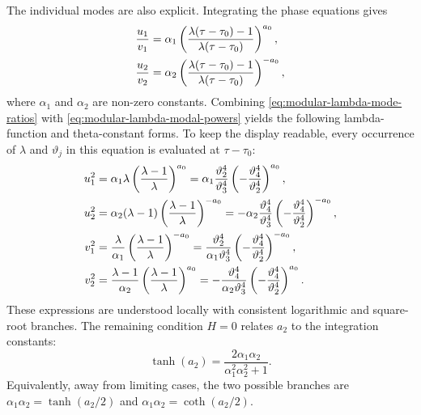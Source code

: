 \documentclass[11pt,a4paper]{article}
\numberwithin{equation}{section}
\begin{document}
The individual modes are also explicit.
Integrating the phase equations gives
\begin{align}
    \frac{u_1}{v_1}
    &=\alpha_1
    \left(
        \frac{\lambda(\tau-\tau_0)-1}{\lambda(\tau-\tau_0)}
    \right)^{a_0},
    \notag\\
    \frac{u_2}{v_2}
    &=\alpha_2
    \left(
        \frac{\lambda(\tau-\tau_0)-1}{\lambda(\tau-\tau_0)}
    \right)^{-a_0},
    \label{eq:modular-lambda-mode-ratios}
\end{align}
where $\alpha_1$ and $\alpha_2$ are non-zero constants.
Combining \eqref{eq:modular-lambda-mode-ratios} with \eqref{eq:modular-lambda-modal-powers} yields
the following lambda-function and theta-constant forms.
To keep the display readable, every occurrence of $\lambda$ and $\vartheta_j$ in this equation is evaluated at $\tau-\tau_0$:
\begin{align}
    u_1^2
    &=\alpha_1\lambda
    \left(\frac{\lambda-1}{\lambda}\right)^{a_0}
    =\alpha_1\frac{\vartheta_2^4}{\vartheta_3^4}
    \left(-\frac{\vartheta_4^4}{\vartheta_2^4}\right)^{a_0},
    \notag\\
    u_2^2
    &=\alpha_2(\lambda-1)
    \left(\frac{\lambda-1}{\lambda}\right)^{-a_0}
    =-\alpha_2\frac{\vartheta_4^4}{\vartheta_3^4}
    \left(-\frac{\vartheta_4^4}{\vartheta_2^4}\right)^{-a_0},
    \notag\\
    v_1^2
    &=\frac{\lambda}{\alpha_1}
    \left(\frac{\lambda-1}{\lambda}\right)^{-a_0}
    =\frac{\vartheta_2^4}{\alpha_1\vartheta_3^4}
    \left(-\frac{\vartheta_4^4}{\vartheta_2^4}\right)^{-a_0},
    \notag\\
    v_2^2
    &=\frac{\lambda-1}{\alpha_2}
    \left(\frac{\lambda-1}{\lambda}\right)^{a_0}
    =-\frac{\vartheta_4^4}{\alpha_2\vartheta_3^4}
    \left(-\frac{\vartheta_4^4}{\vartheta_2^4}\right)^{a_0}.
    \label{eq:modular-lambda-mode-solutions}
\end{align}
These expressions are understood locally with consistent logarithmic and square-root branches.
The remaining condition $H=0$ relates $a_2$ to the integration constants:
\begin{equation}
    \tanh(a_2)
    =\frac{2\alpha_1\alpha_2}
    {\alpha_1^2\alpha_2^2+1}.
    \label{eq:modular-lambda-a2-condition}
\end{equation}
Equivalently, away from limiting cases, the two possible branches are
$\alpha_1\alpha_2=\tanh(a_2/2)$ and
$\alpha_1\alpha_2=\coth(a_2/2)$.
\end{document}
